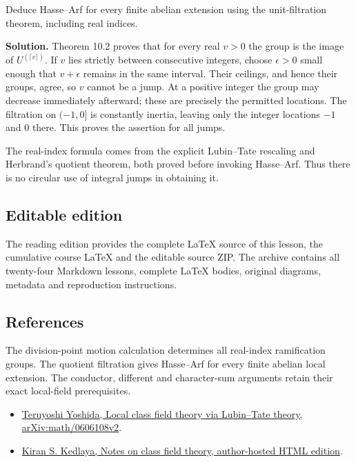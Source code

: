 \documentclass[11pt,a4paper]{article}
\newcommand{\tightlist}{\setlength{\itemsep}{0pt}\setlength{\parskip}{0pt}}
\begin{document}
Deduce Hasse--Arf for every finite abelian extension using the
unit-filtration theorem, including real indices.

\textbf{Solution.} Theorem 10.2 proves that for every real \(v>0\) the
group is the image of \(U^{(\lceil v\rceil)}\). If \(v\) lies strictly
between consecutive integers, choose \(\epsilon>0\) small enough that
\(v+\epsilon\) remains in the same interval. Their ceilings, and hence
their groups, agree, so \(v\) cannot be a jump. At a positive integer
the group may decrease immediately afterward; these are precisely the
permitted locations. The filtration on \((-1,0]\) is constantly inertia,
leaving only the integer locations \(-1\) and 0 there. This proves the
assertion for all jumps.

The real-index formula comes from the explicit Lubin--Tate rescaling and
Herbrand's quotient theorem, both proved before invoking Hasse--Arf.
Thus there is no circular use of integral jumps in obtaining it.

\subsection{Editable edition}\label{editable-edition}

The reading edition provides the complete LaTeX source of this lesson,
the cumulative course LaTeX and the editable source ZIP. The archive
contains all twenty-four Markdown lessons, complete LaTeX bodies,
original diagrams, metadata and reproduction instructions.

\subsection{References}\label{references}

The division-point motion calculation determines all real-index
ramification groups. The quotient filtration gives Hasse--Arf for every
finite abelian local extension. The conductor, different and
character-sum arguments retain their exact local-field prerequisites.

\begin{itemize}
\tightlist
\item
  \href{https://arxiv.org/abs/math/0606108v2}{Teruyoshi Yoshida, Local
  class field theory via Lubin--Tate theory, arXiv:math/0606108v2}.
\item
  \href{https://kskedlaya.org/cft/sec_abstractcft1.html}{Kiran S.
  Kedlaya, Notes on class field theory, author-hosted HTML edition}.
\end{itemize}
\end{document}
